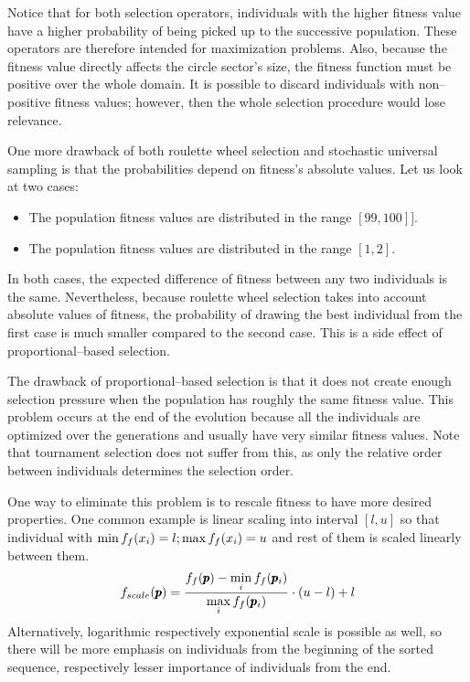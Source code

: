 Notice that for both selection operators, individuals with the higher fitness value have a higher probability of being picked up to the successive population. These operators are therefore intended for maximization problems. Also, because the fitness value directly affects the circle sector's size, the fitness function must be positive over the whole domain. It is possible to discard individuals with non--positive fitness values; however, then the whole selection procedure would lose relevance.

One more drawback of both roulette wheel selection and stochastic universal sampling is that the probabilities depend on fitness's absolute values. Let us look at two cases:
\begin{itemize}
    \item The population fitness values are distributed in the range $\left[ 99,100 \right]]$.
    \item The population fitness values are distributed in the range $\left[ 1, 2\right]$.
\end{itemize}
In both cases, the expected difference of fitness between any two individuals is the same. Nevertheless, because roulette wheel selection takes into account absolute values of fitness, the probability of drawing the best individual from the first case is much smaller compared to the second case. This is a side effect of proportional--based selection.

The drawback of proportional--based selection is that it does not create enough selection pressure when the population has roughly the same fitness value. This problem occurs at the end of the evolution because all the individuals are optimized over the generations and usually have very similar fitness values. Note that tournament selection does not suffer from this, as only the relative order between individuals determines the selection order.

One way to eliminate this problem is to rescale fitness to have more desired properties. One common example is linear scaling into interval $\left[ l,u \right]$ so that individual with $\min f_f(x_i)=l; \max f_f(x_i)=u$ and rest of them is scaled linearly between them. 
$$
f_{scale}(\pmb{p})=\frac{f_f(\pmb{p}) - \min\limits_{i}f_f(\pmb{p}_i)}{\max\limits_{i}f_f(\pmb{p}_i)}\cdot(u-l)+l 
$$
Alternatively, logarithmic respectively exponential scale is possible as well, so there will be more emphasis on individuals from the beginning of the sorted sequence, respectively lesser importance of individuals from the end.

